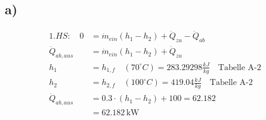 

\subsection*{a)}
\begin{align*}
1. HS: \quad 0 &= \dot{m}_{ein} (h_1 - h_2) + \dot{Q}_{zu} - \dot{Q}_{ab} \\
\dot{Q}_{ab, aus} &= \dot{m}_{ein} (h_1 - h_2) + \dot{Q}_{zu} \\
h_1 &= h_{1,f} \quad (70^\circ C) = 283.29298 \frac{kJ}{kg} \quad \text{Tabelle A-2} \\
h_2 &= h_{2,f} \quad (100^\circ C) = 419.04 \frac{kJ}{kg} \quad \text{Tabelle A-2} \\
\dot{Q}_{ab, aus} &= 0.3 \cdot (h_1 - h_2) + 100 = 62.182 \\
&= \boxed{62.182 \, \text{kW}}
\end{align*}